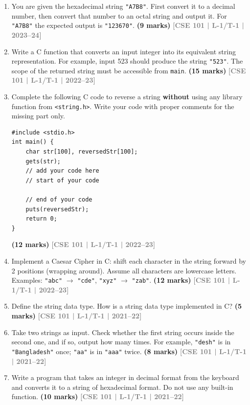 \documentclass[12pt,a3paper]{article}
\newcommand{\yr}[1]{\hfill\textcolor{gray}{\small\textbf{[#1]}}}
\newcommand{\mk}[1]{\textcolor{orange!70!black}{\small\textbf{(#1 marks)}}}
\begin{document}
\begin{enumerate}
\item You are given the hexadecimal string \texttt{"A7B8"}. First convert it to a decimal number, then convert that number to an octal string and output it. For \texttt{"A7B8"} the expected output is \texttt{"123670"}.
\mk{9} \yr{CSE 101 | L-1/T-1 | 2023--24}

\item Write a C function that converts an input integer into its equivalent string representation. For example, input 523 should produce the string \texttt{"523"}. The scope of the returned string must be accessible from \texttt{main}.
\mk{15} \yr{CSE 101 | L-1/T-1 | 2022--23}

\item Complete the following C code to reverse a string \textbf{without} using any library function from \texttt{<string.h>}. Write your code with proper comments for the missing part only.
 
\begin{lstlisting}
#include <stdio.h>
int main() {
    char str[100], reversedStr[100];
    gets(str);
    // add your code here
    // start of your code

    // end of your code
    puts(reversedStr);
    return 0;
}
\end{lstlisting}
\mk{12} \yr{CSE 101 | L-1/T-1 | 2022--23}

\item Implement a Caesar Cipher in C: shift each character in the string forward by 2 positions (wrapping around). Assume all characters are lowercase letters. Examples: \texttt{"abc"} $\to$ \texttt{"cde"}, \texttt{"xyz"} $\to$ \texttt{"zab"}.
\mk{12} \yr{CSE 101 | L-1/T-1 | 2022--23}

\item Define the string data type. How is a string data type implemented in C?
\mk{5} \yr{CSE 101 | L-1/T-1 | 2021--22}

\item Take two strings as input. Check whether the first string occurs inside the second one, and if so, output how many times. For example, \texttt{"desh"} is in \texttt{"Bangladesh"} once; \texttt{"aa"} is in \texttt{"aaa"} twice.
\mk{8} \yr{CSE 101 | L-1/T-1 | 2021--22}

\item Write a program that takes an integer in decimal format from the keyboard and converts it to a string of hexadecimal format. Do not use any built-in function.
\mk{10} \yr{CSE 101 | L-1/T-1 | 2021--22}


\end{enumerate}
\end{document}
